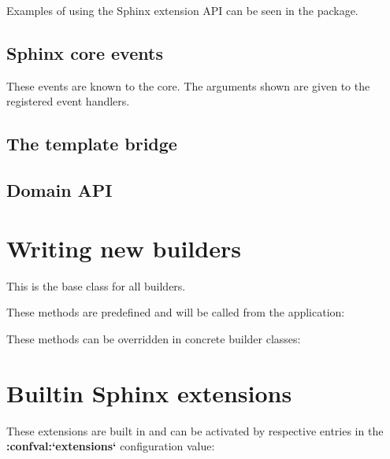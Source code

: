 \documentclass[letterpaper,10pt,english]{sphinxmanual}
\begin{document}
Examples of using the Sphinx extension API can be seen in the 
package.


\subsection{Sphinx core events}
\label{ext/appapi:sphinx-core-events}\label{ext/appapi:events}
These events are known to the core.  The arguments shown are given to the
registered event handlers.


\subsection{The template bridge}
\label{ext/appapi:the-template-bridge}\label{ext/appapi:template-bridge}

\subsection{Domain API}
\label{ext/appapi:domain-api}\label{ext/appapi:module-sphinx.domains}\label{ext/appapi:id5}

\section{Writing new builders}
\label{ext/builderapi::doc}\label{ext/builderapi:writing-new-builders}\label{ext/builderapi:writing-builders}

\begin{fulllineitems}
\label{ext/builderapi:sphinx.builders.Builder}
This is the base class for all builders.

These methods are predefined and will be called from the application:

These methods can be overridden in concrete builder classes:

\end{fulllineitems}



\section{Builtin Sphinx extensions}
\label{extensions:builtin-sphinx-extensions}
These extensions are built in and can be activated by respective entries in the
{\color{red}\bfseries{}:confval:{}`extensions{}`} configuration value:
\end{document}
